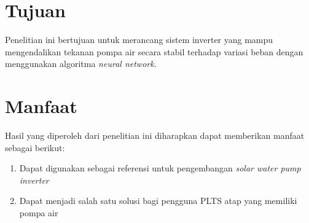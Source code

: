 \section{Tujuan}

Penelitian ini bertujuan untuk merancang sistem inverter 
yang mampu mengendalikan tekanan pompa air secara stabil 
terhadap variasi beban dengan menggunakan algoritma \emph{neural network}.

\section{Manfaat}

Hasil yang diperoleh dari penelitian ini diharapkan dapat memberikan 
manfaat sebagai berikut:

\begin{enumerate}
    \item Dapat digunakan sebagai referensi untuk pengembangan \textit{solar water pump inverter}
    \item Dapat menjadi salah satu solusi bagi pengguna PLTS atap yang memiliki pompa air
    \end{enumerate}
    




